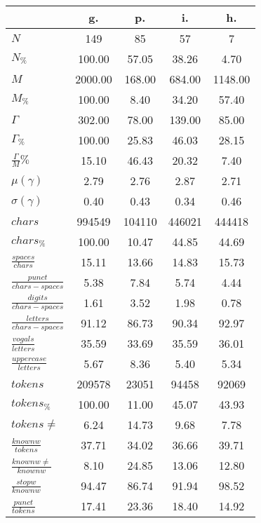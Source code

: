 \begin{table}[h!]
\begin{center}
\begin{tabular}{| l || c | c | c | c |}\hline
 & {\bf g.} & {\bf p.} & {\bf i.} & {\bf h.} \\\hline\hline
$N$ & 149  & 85  & 57  & 7 \\
$N_{\%}$ & 100.00  & 57.05  & 38.26  & 4.70 \\\hline
$M$ & 2000.00  & 168.00  & 684.00  & 1148.00 \\
$M_{\%}$ & 100.00  & 8.40  & 34.20  & 57.40 \\\hline
$\Gamma$ & 302.00  & 78.00  & 139.00  & 85.00 \\
$\Gamma_{\%}$ & 100.00  & 25.83  & 46.03  & 28.15 \\\hline
$\frac{\Gamma}{M}\%$ & 15.10  & 46.43  & 20.32  & 7.40 \\
$\mu(\gamma)$ & 2.79  & 2.76  & 2.87  & 2.71 \\
$\sigma(\gamma)$ & 0.40  & 0.43  & 0.34  & 0.46 \\\hline\hline
$chars$ & 994549  & 104110  & 446021  & 444418 \\
$chars_{\%}$ & 100.00  & 10.47  & 44.85  & 44.69 \\\hline
$\frac{spaces}{chars}$ & 15.11  & 13.66  & 14.83  & 15.73 \\
$\frac{punct}{chars-spaces}$ & 5.38  & 7.84  & 5.74  & 4.44 \\
$\frac{digits}{chars-spaces}$ & 1.61  & 3.52  & 1.98  & 0.78 \\\hline
$\frac{letters}{chars-spaces}$ & 91.12  & 86.73  & 90.34  & 92.97 \\
$\frac{vogals}{letters}$ & 35.59  & 33.69  & 35.59  & 36.01 \\
$\frac{uppercase}{letters}$ & 5.67  & 8.36  & 5.40  & 5.34 \\\hline\hline
$tokens$ & 209578  & 23051  & 94458  & 92069 \\
$tokens_{\%}$ & 100.00  & 11.00  & 45.07  & 43.93 \\
$tokens \neq$ & 6.24  & 14.73  & 9.68  & 7.78 \\\hline
$\frac{knownw}{tokens}$ & 37.71  & 34.02  & 36.66  & 39.71 \\
$\frac{knownw \neq}{knownw}$ & 8.10  & 24.85  & 13.06  & 12.80 \\\hline
$\frac{stopw}{knownw}$ & 94.47  & 86.74  & 91.94  & 98.52 \\
$\frac{punct}{tokens}$ & 17.41  & 23.36  & 18.40  & 14.92 \\

\end{tabular}
\end{center}
\end{table}
